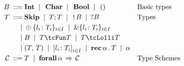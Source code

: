 \begin{figure}[h!]
  \begin{align*}
    \tcBase \grmeq & \inte \grmor \, \chare \grmor \, \boole \grmor \, \unite && \text{Basic types}\\
    T \grmeq       & \tskip \grmor \tSemi{T}{T} \grmor \,\tOut{\tcBase} \grmor \,\tIn{\tcBase} && \text{Types}\\
    \grmor         & \tIChoice\{l_i\colon T_i\}_{i\in I} \grmor \tEChoice\{l_i\colon T_i\}_{i\in I} \\ 
    \grmor         & \tcBase \grmor \tUnFun{T}{T} \grmor \tLinFun{T}{T}\\   
    \grmor         & \tPair{T}{T} \grmor \tDatatype{l_i\colon T_i}_{i\in I} \grmor \tRec{\alpha}{T} \grmor \alpha\\
    \kindsch \grmeq & T \grmor \tForall{\alpha}{\kindsch}  && \text{Type Schemes}
  \end{align*}
\end{figure}


